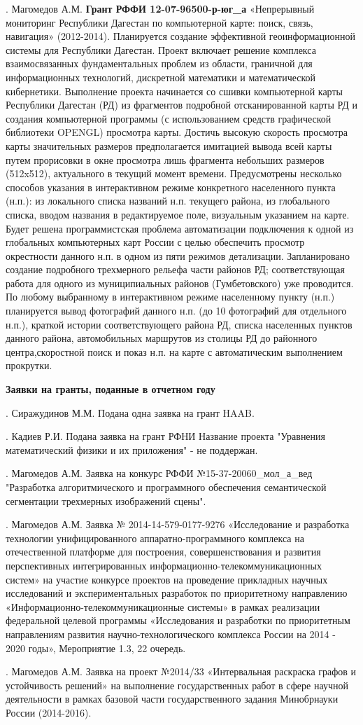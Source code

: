 \documentclass{article}
\begin{document}
.  Магомедов А.М. \textbf{Грант РФФИ 12-07-96500-р-юг\_а} «Непрерывный мониторинг Республики Дагестан по компьютерной карте: поиск, связь, навигация» (2012-2014). Планируется создание эффективной геоинформационной системы для Республики Дагестан. Проект включает решение комплекса взаимосвязанных фундаментальных проблем из области, граничной для информационных технологий, дискретной математики и математической кибернетики. Выполнение проекта начинается со сшивки компьютерной карты Республики Дагестан (РД) из фрагментов подробной отсканированной карты РД и создания компьютерной программы (с использованием средств графической библиотеки OPENGL) просмотра карты. Достичь высокую скорость просмотра карты значительных размеров предполагается имитацией вывода всей карты путем прорисовки в окне просмотра лишь фрагмента небольших размеров (512x512), актуального в текущий момент времени. Предусмотрены несколько способов указания в интерактивном режиме конкретного населенного пункта (н.п.): из локального списка названий н.п. текущего района, из глобального списка, вводом названия в редактируемое поле, визуальным указанием на карте. Будет решена программистская проблема автоматизации подключения к одной из глобальных компьютерных карт России с целью обеспечить просмотр окрестности данного н.п. в одном из пяти режимов детализации. Запланировано создание подробного трехмерного рельефа части районов РД; соответствующая работа для одного из муниципиальных районов (Гумбетовского) уже проводится. По любому выбранному в интерактивном режиме населенному пункту (н.п.) планируется вывод фотографий данного н.п. (до 10 фотографий для отдельного н.п.), краткой истории соответствующего района РД, списка населенных пунктов данного района, автомобильных маршрутов из столицы РД до районного центра,скоростной поиск и показ н.п. на карте с автоматическим выполнением прокрутки.

\noindent \textbf{Заявки на гранты, поданные в отчетном году}

.  Сиражудинов М.М. Подана одна заявка на грант HAAB.

.  Кадиев Р.И. Подана заявка на грант  РФНИ Название проекта "Уравнения математический физики и их приложения" - не поддержан.

.  Магомедов А.М. Заявка на конкурс РФФИ №15-37-20060\_мол\_а\_вед "Разработка алгоритмического и программного обеспечения семантической сегментации трехмерных изображений сцены".

.  Магомедов А.М. Заявка № 2014-14-579-0177-9276 «Исследование и разработка технологии унифицированного аппаратно-программного комплекса на отечественной платформе для построения, совершенствования и развития перспективных интегрированных информационно-телекоммуникационных систем» на участие конкурсе проектов на проведение прикладных научных исследований и экспериментальных разработок  по приоритетному направлению «Информационно-телекоммуникационные системы» в рамках реализации федеральной целевой программы «Исследования и разработки по приоритетным направлениям развития научно-технологического комплекса России на 2014 - 2020 годы», Мероприятие 1.3, 22 очередь.

.  Магомедов А.М. Заявка на проект №2014/33 «Интервальная раскраска графов и устойчивость решений» на выполнение государственных работ в сфере научной деятельности в рамках базовой части государственного задания Минобрнауки России (2014-2016).

\noindent
\end{document}
